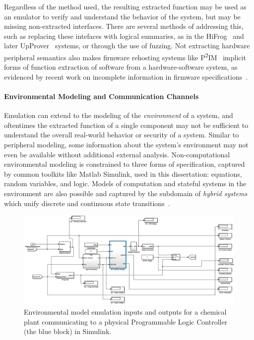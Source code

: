 Regardless of the method used, the resulting extracted function may be used as an emulator to verify and understand the behavior of the system, but may be missing non-extracted interfaces.
There are several methods of addressing this, such as replacing these intefaces with logical summaries, as in the HiFrog~\cite{hifrog} and later UpProver~\cite{upprover} systems, or through the use of fuzzing.
Not extracting hardware peripheral semantics also makes firmware rehosting systems like P\textsuperscript{2}IM~\cite{p2im2020} implicit forms of function extraction of software from a hardware-software system, as evidenced by recent work on incomplete information in firmware specifications~\cite{zhou2022your}.

\paragraph{Environmental Modeling and Communication Channels}

Emulation can extend to the modeling of the \emph{environment} of a system, and oftentimes the extracted function of a single component may not be sufficient to understand the overall real-world behavior or security of a system.
Similar to peripheral modeling, some information about the system's environment may not even be available without additional external analysis.
Non-computational environmental modeling is constrained to three forms of specification, captured by common toolkits like Matlab Simulink, used in this dissertation: equations, random variables, and logic.
Models of computation and stateful systems in the environment are also possible and captured by the subdomain of \emph{hybrid systems} which unify discrete and continuous state transitions~\cite{henzinger1996theory}.

\begin{figure}
\centering
\includegraphics[width=\textwidth]{envir-model.pdf}
\caption{Environmental model emulation inputs and outputs for a chemical plant communicating to a physical Programmable Logic Controller (the blue block) in Simulink.}
\label{fig:envir-model}
\end{figure}

